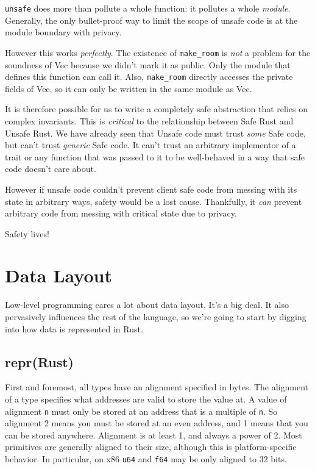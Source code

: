 \documentclass[a4paper,]{book}
\begin{document}
\texttt{unsafe} does more than pollute a whole function: it pollutes a
whole \emph{module}. Generally, the only bullet-proof way to limit the
scope of unsafe code is at the module boundary with privacy.

However this works \emph{perfectly}. The existence of
\texttt{make\_room} is \emph{not} a problem for the soundness of Vec
because we didn't mark it as public. Only the module that defines this
function can call it. Also, \texttt{make\_room} directly accesses the
private fields of Vec, so it can only be written in the same module as
Vec.

It is therefore possible for us to write a completely safe abstraction
that relies on complex invariants. This is \emph{critical} to the
relationship between Safe Rust and Unsafe Rust. We have already seen
that Unsafe code must trust \emph{some} Safe code, but can't trust
\emph{generic} Safe code. It can't trust an arbitrary implementor of a
trait or any function that was passed to it to be well-behaved in a way
that safe code doesn't care about.

However if unsafe code couldn't prevent client safe code from messing
with its state in arbitrary ways, safety would be a lost cause.
Thankfully, it \emph{can} prevent arbitrary code from messing with
critical state due to privacy.

Safety lives!

\chapter{Data Layout}\label{sec--data}

Low-level programming cares a lot about data layout. It's a big deal. It
also pervasively influences the rest of the language, so we're going to
start by digging into how data is represented in Rust.

\section{repr(Rust)}\label{sec--repr-rust}

First and foremost, all types have an alignment specified in bytes. The
alignment of a type specifies what addresses are valid to store the
value at. A value of alignment \texttt{n} must only be stored at an
address that is a multiple of \texttt{n}. So alignment 2 means you must
be stored at an even address, and 1 means that you can be stored
anywhere. Alignment is at least 1, and always a power of 2. Most
primitives are generally aligned to their size, although this is
platform-specific behavior. In particular, on x86 \texttt{u64} and
\texttt{f64} may be only aligned to 32 bits.
\end{document}
